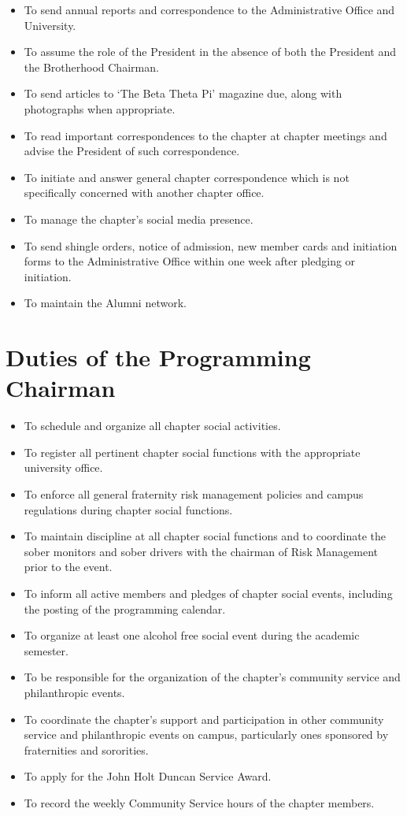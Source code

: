 \begin{itemize}

\item To send annual reports and correspondence to the Administrative Office
and University.
\item To assume the role of the President in the absence of both the President
and the Brotherhood Chairman.
\item To send articles to ‘The Beta Theta Pi’ magazine due, along with
photographs when appropriate.
\item To read important correspondences to the chapter at chapter meetings and
advise the President of such correspondence.
\item To initiate and answer general chapter correspondence which is not
specifically concerned with another chapter office.
\item To manage the chapter’s social media presence.
\item To send shingle orders, notice of admission, new member cards and
initiation forms to the Administrative Office within one week after pledging or
initiation.
\item To maintain the Alumni network.
\end{itemize}

\section{Duties of the Programming Chairman}
\label{sec:duties-of-the-programming-chairman}

\begin{itemize}

\item To schedule and organize all chapter social activities. 
\item To register all pertinent chapter social functions with the appropriate university office. 
\item To enforce all general fraternity risk management policies and campus regulations during chapter social functions. 
\item To maintain discipline at all chapter social functions and to coordinate the sober monitors and sober drivers with the chairman of Risk Management prior to the event. 
\item To inform all active members and pledges of chapter social events, including the posting of the programming calendar. 
\item To organize at least one alcohol free social event during the academic semester.
\item To be responsible for the organization of the chapter’s community service and philanthropic events.
\item To coordinate the chapter’s support and participation in other community service and philanthropic events on campus, particularly ones sponsored by fraternities and sororities.
\item To apply for the John Holt Duncan Service Award.
\item To record the weekly Community Service hours of the chapter members.
\end{itemize}


